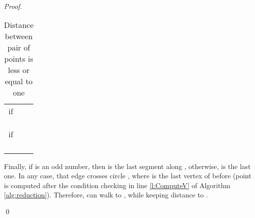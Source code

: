 \documentclass[a4paper,UKenglish]{lipics}
\begin{document}
\begin{proof}
\begin{table}[h]
\begin{tabular}{ r | l | l  }
if  &  				 		   &      \\
 &  &  \\
 &  &  \\


 &    &  \\







if  &  				
 		   &     \\
&  & \\
 & &  \\
 & &  \\
&   &  \\


\end{tabular}
\caption{Distance between pair of points is less or equal to one}
\label{tab:PathB}
\end{table}



Finally, if  is an odd number, then  
 is the last segment along , otherwise, 
 is the last one. In any case, 
that edge crosses  circle , where  is the last vertex of 
 before  (point  is computed after the condition checking 
in line \ref{l:ComputeV} of 
Algorithm \ref{alg:reduction}). Therefore, 
  can walk to , while keeping distance  to . 


\qed
\end{proof}
\end{document}
